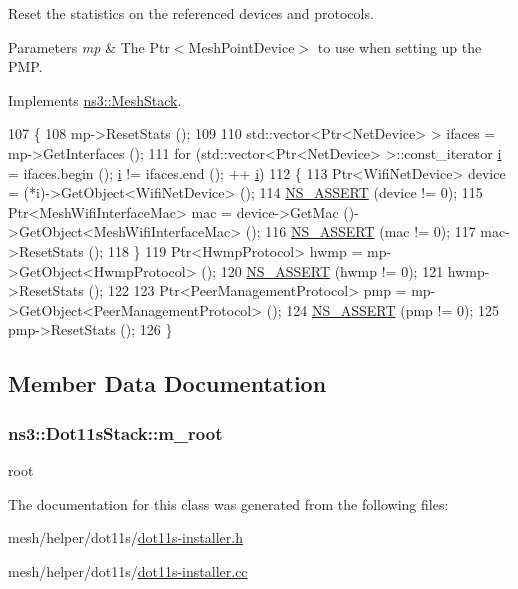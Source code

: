 Reset the statistics on the referenced devices and protocols. 


\begin{DoxyParams}{Parameters}
{\em mp} & The Ptr$<$\+Mesh\+Point\+Device$>$ to use when setting up the P\+MP. \\
\hline
\end{DoxyParams}


Implements \hyperlink{classns3_1_1MeshStack_af694bf8e1ef6fba265d0b4ec8b09bbf4}{ns3\+::\+Mesh\+Stack}.


\begin{DoxyCode}
107 \{
108   mp->ResetStats ();
109 
110   std::vector<Ptr<NetDevice> > ifaces = mp->GetInterfaces ();
111   \textcolor{keywordflow}{for} (std::vector<Ptr<NetDevice> >::const\_iterator \hyperlink{bernuolliDistribution_8m_a6f6ccfcf58b31cb6412107d9d5281426}{i} = ifaces.begin (); \hyperlink{bernuolliDistribution_8m_a6f6ccfcf58b31cb6412107d9d5281426}{i} != ifaces.end (); ++
      \hyperlink{bernuolliDistribution_8m_a6f6ccfcf58b31cb6412107d9d5281426}{i})
112     \{
113       Ptr<WifiNetDevice> device = (*i)->GetObject<WifiNetDevice> ();
114       \hyperlink{assert_8h_a6dccdb0de9b252f60088ce281c49d052}{NS\_ASSERT} (device != 0);
115       Ptr<MeshWifiInterfaceMac> mac = device->GetMac ()->GetObject<MeshWifiInterfaceMac> ();
116       \hyperlink{assert_8h_a6dccdb0de9b252f60088ce281c49d052}{NS\_ASSERT} (mac != 0);
117       mac->ResetStats ();
118     \}
119   Ptr<HwmpProtocol> hwmp = mp->GetObject<HwmpProtocol> ();
120   \hyperlink{assert_8h_a6dccdb0de9b252f60088ce281c49d052}{NS\_ASSERT} (hwmp != 0);
121   hwmp->ResetStats ();
122 
123   Ptr<PeerManagementProtocol> pmp = mp->GetObject<PeerManagementProtocol> ();
124   \hyperlink{assert_8h_a6dccdb0de9b252f60088ce281c49d052}{NS\_ASSERT} (pmp != 0);
125   pmp->ResetStats ();
126 \}
\end{DoxyCode}


\subsection{Member Data Documentation}
\subsubsection[{\texorpdfstring{m\+\_\+root}{m_root}}]{ ns3\+::\+Dot11s\+Stack\+::m\+\_\+root\hspace{0.3cm}{\ttfamily [private]}}\hypertarget{classns3_1_1Dot11sStack_afc4a1c662a6d2c0a62672924f49b2a0c}{}\label{classns3_1_1Dot11sStack_afc4a1c662a6d2c0a62672924f49b2a0c}


root 



The documentation for this class was generated from the following files\+:\begin{DoxyCompactItemize}
\item 
mesh/helper/dot11s/\hyperlink{dot11s-installer_8h}{dot11s-\/installer.\+h}\item 
mesh/helper/dot11s/\hyperlink{dot11s-installer_8cc}{dot11s-\/installer.\+cc}\end{DoxyCompactItemize}
